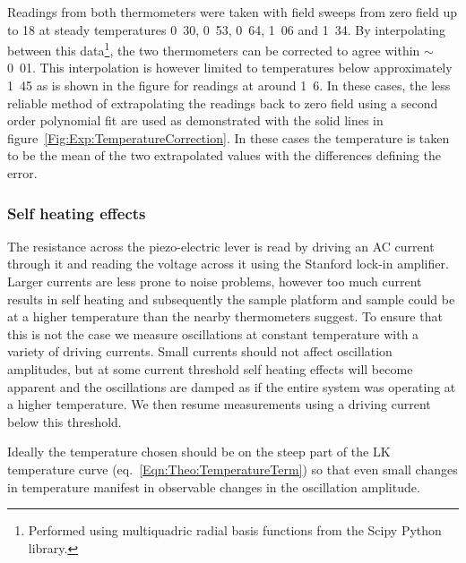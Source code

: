 Readings from both thermometers were taken with field sweeps from zero field up to \unit{18}{\tesla} at steady temperatures \unit{0.30}{\kelvin}, \unit{0.53}{\kelvin}, \unit{0.64}{\kelvin}, \unit{1.06}{\kelvin} and \unit{1.34}{\kelvin}. By interpolating between this data\footnote{Performed using multiquadric radial basis functions from the Scipy Python library.}, the two thermometers can be corrected to agree within $\sim$\unit{0.01}{\kelvin}. This interpolation is however limited to temperatures below approximately \unit{1.45}{\kelvin} as is shown in the figure for readings at around \unit{1.6}{\kelvin}. In these cases, the less reliable method of extrapolating the readings back to zero field using a second order polynomial fit are used as demonstrated with the solid lines in figure~\ref{Fig:Exp:TemperatureCorrection}. In these cases the temperature is taken to be the mean of the two extrapolated values with the differences defining the error.

\subsubsection{Self heating effects}

The resistance across the piezo-electric lever is read by driving an AC current through it and reading the voltage across it using the Stanford lock-in amplifier. Larger currents are less prone to noise problems, however too much current results in self heating and subsequently the sample platform and sample could be at a higher temperature than the nearby thermometers suggest. To ensure that this is not the case we measure oscillations at constant temperature with a variety of driving currents. Small currents should not affect oscillation amplitudes, but at some current threshold self heating effects will become apparent and the oscillations are damped as if the entire system was operating at a higher temperature. We then resume measurements using a driving current below this threshold.

Ideally the temperature chosen should be on the steep part of the \ac{LK} temperature curve (eq.~\ref{Eqn:Theo:TemperatureTerm}) so that even small changes in temperature manifest in observable changes in the oscillation amplitude.

